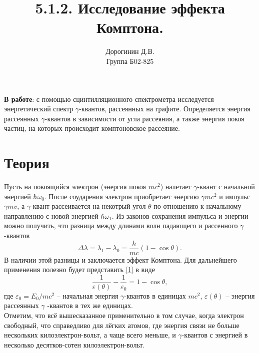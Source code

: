 \documentclass[a4paper,12pt]{article}
\date{\vspace{-10pt}}
\author{Дорогинин Д.В.\\
Группа Б02-825}
\title{\textbf{5.1.2. Исследование эффекта Комптона.}}
\theoremstyle{definition}
\begin{document}
\maketitle
\textbf{В работе}: с помощью сцинтилляционного спектрометра исследуется энергетический спектр $\gamma$-квантов, рассеянных на графите. Определяется энергия рассеянных $\gamma$-квантов в зависимости от угла рассеяния, а также энергия покоя частиц, на которых происходит комптоновское рассеяние.
\section*{Теория}
Пусть на покоящийся электрон (энергия покоя $mc^2$) налетает $\gamma$-квант с начальной энергией $\hbar \omega_0$. После соударения электрон приобретает энергию $\gamma mc^2$ и импульс $\gamma mv$, а $\gamma$-квант рассеивается на некотрый угол $\theta$ по отношению к начальному направлению с новой энергией $\hbar \omega_1$. Из законов сохранения импульса и энергии можно получить, что разница между длинами волн падающего и рассенного $\gamma$-квантов
\begin{equation}\label{1}
\Delta \lambda = \lambda_1 - \lambda_0 = \dfrac{h}{mc} (1-\cos \theta).
\end{equation}
В наличии этой разницы и заключается эффект Комптона. Для дальнейшего применения полезно будет представить \eqref{1} в виде
\[\tag{1a}\label{1a}
\dfrac{1}{\varepsilon(\theta)} - \dfrac{1}{\varepsilon_0} = 1 - \cos \theta,
\]
где $\varepsilon_0 = E_0/mc^2$ -- начальная энергия $\gamma$-квантов в единицах $mc^2$, $\varepsilon(\theta)$ -- энергия рассеянных $\gamma$ -квантов в тех же единицах.\\
Отметим, что всё вышесказанное применительно в том случае, когда электрон свободный, что справедливо для лёгких атомов, где энергия связи не больше нескольких килоэлектрон-вольт, а чаще всего меньше, и $\gamma$-квантов с энергией в несколько десятков-сотен килоэлектрон-вольт.
\end{document}
